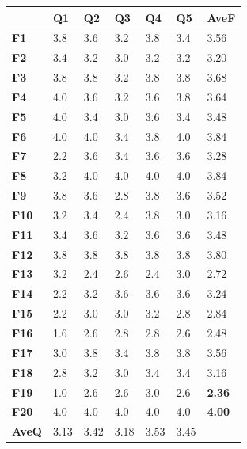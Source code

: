 			\begin{table}[!htpb]
			  \centering
			   \label{tab:results-features-it2}
			  \begin{tabular}{|R{1.5cm}|R{1cm}|R{1cm}|R{1cm}|R{1cm}|R{1cm}|R{1.5cm}|}
			  	\hline
			  	& \textbf{Q1} & \textbf{Q2} & \textbf{Q3} & \textbf{Q4} & \textbf{Q5} & \textbf{AveF} \\ \hline
			    \textbf{F1} & 3.8 		& 3.6 	& 3.2 	& 3.8 	& 3.4 	&  3.56 \\ \hline
			    \textbf{F2} & 3.4 		& 3.2 	& 3.0 	& 3.2 	& 3.2 	&  3.20 \\ \hline
			    \textbf{F3} & 3.8 		& 3.8 	& 3.2 	& 3.8 	& 3.8 	&  3.68 \\ \hline
			    \textbf{F4} & 4.0 		& 3.6 	& 3.2 	& 3.6 	& 3.8 	&  3.64 \\ \hline
			    \textbf{F5} & 4.0 		& 3.4 	& 3.0 	& 3.6 	& 3.4 	&  3.48 \\ \hline
			    \textbf{F6} & 4.0 		& 4.0 	& 3.4 	& 3.8 	& 4.0 	&  3.84 \\ \hline
			    \textbf{F7} & 2.2 		& 3.6 	& 3.4 	& 3.6 	& 3.6 	&  3.28 \\ \hline
			    \textbf{F8} & 3.2 		& 4.0 	& 4.0 	& 4.0 	& 4.0 	&  3.84 \\ \hline
			    \textbf{F9} & 3.8 		& 3.6 	& 2.8 	& 3.8 	& 3.6 	& 3.52 \\ \hline
			    \textbf{F10} & 3.2 		& 3.4 	& 2.4 	& 3.8 	& 3.0 	& 3.16 \\ \hline
			    \textbf{F11} & 3.4 		& 3.6 	& 3.2 	& 3.6 	& 3.6 	& 3.48 \\ \hline
			    \textbf{F12} & 3.8 		& 3.8 	& 3.8 	& 3.8 	& 3.8 	& 3.80 \\ \hline
			    \textbf{F13} & 3.2 		& 2.4 	& 2.6 	& 2.4 	& 3.0 	& 2.72 \\ \hline
			    \textbf{F14} & 2.2 		& 3.2 	& 3.6 	& 3.6 	& 3.6 	& 3.24 \\ \hline
			    \textbf{F15} & 2.2 		& 3.0 	& 3.0 	& 3.2 	& 2.8 	& 2.84 \\ \hline
			    \textbf{F16} & 1.6 		& 2.6 	& 2.8 	& 2.8 	& 2.6 	& 2.48 \\ \hline
			    \textbf{F17} & 3.0 		& 3.8 	& 3.4 	& 3.8 	& 3.8 	& 3.56 \\ \hline
			    \textbf{F18} & 2.8 		& 3.2 	& 3.0 	& 3.4 	& 3.4 	& 3.16 \\ \hline
			    \textbf{F19} & 1.0 		& 2.6 	& 2.6 	& 3.0 	& 2.6 	& \textbf{2.36} \\ \hline
			    \textbf{F20} & 4.0 		& 4.0 	& 4.0 	& 4.0 	& 4.0 	& \textbf{4.00} \\ \hline
			    
			   \textbf{AveQ} & 3.13 & 3.42 & 3.18 & 3.53 & 3.45 & \\ \hline
			  \end{tabular}
			\end{table}

